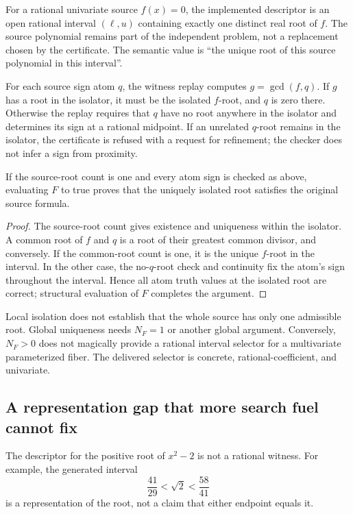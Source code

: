 For a rational univariate source $f(x)=0$, the implemented descriptor is an open rational interval $(\ell,u)$ containing exactly one distinct real root of $f$. The source polynomial remains part of the independent problem, not a replacement chosen by the certificate. The semantic value is ``the unique root of this source polynomial in this interval''.

For each source sign atom $q$, the witness replay computes $g=\gcd(f,q)$. If $g$ has a root in the isolator, it must be the isolated $f$-root, and $q$ is zero there. Otherwise the replay requires that $q$ have no root anywhere in the isolator and determines its sign at a rational midpoint. If an unrelated $q$-root remains in the isolator, the certificate is refused with a request for refinement; the checker does not infer a sign from proximity.

\begin{proposition}\label{prop:witness}
If the source-root count is one and every atom sign is checked as above, evaluating $F$ to true proves that the uniquely isolated root satisfies the original source formula.
\end{proposition}
\begin{proof}
The source-root count gives existence and uniqueness within the isolator. A common root of $f$ and $q$ is a root of their greatest common divisor, and conversely. If the common-root count is one, it is the unique $f$-root in the interval. In the other case, the no-$q$-root check and continuity fix the atom's sign throughout the interval. Hence all atom truth values at the isolated root are correct; structural evaluation of $F$ completes the argument.
\end{proof}

Local isolation does not establish that the whole source has only one admissible root. Global uniqueness needs $N_F=1$ or another global argument. Conversely, $N_F>0$ does not magically provide a rational interval selector for a multivariate parameterized fiber. The delivered selector is concrete, rational-coefficient, and univariate.

\subsection{A representation gap that more search fuel cannot fix}

The descriptor for the positive root of $x^2-2$ is not a rational witness. For example, the generated interval
\[
\frac{41}{29}<\sqrt2<\frac{58}{41}
\]
is a representation of the root, not a claim that either endpoint equals it.

